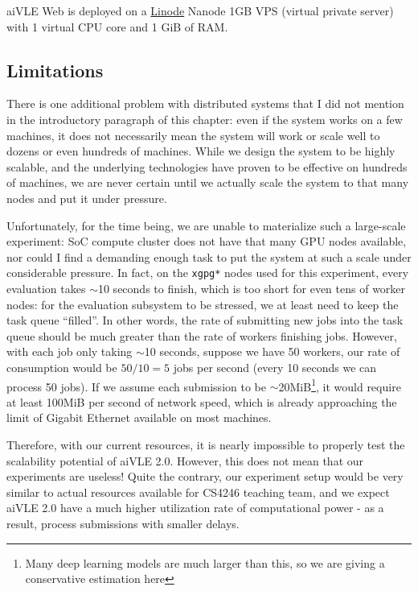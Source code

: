aiVLE Web is deployed on a \href{https://linode.com/}{Linode} Nanode 1GB VPS (virtual private server) with 1 virtual CPU core and 1 GiB of RAM.

\subsection{Limitations}
\label{ss:deployment-limitations}
There is one additional problem with distributed systems that I did not mention in the introductory paragraph of this chapter: even if the system works on a few machines, it does not necessarily mean the system will work or scale well to dozens or even hundreds of machines. While we design the system to be highly scalable, and the underlying technologies have proven to be effective on hundreds of machines, we are never certain until we actually scale the system to that many nodes and put it under pressure.

Unfortunately, for the time being, we are unable to materialize such a large-scale experiment: SoC compute cluster does not have that many GPU nodes available, nor could I find a demanding enough task to put the system at such a scale under considerable pressure. In fact, on the \texttt{xgpg*} nodes used for this experiment, every evaluation takes $\sim$10 seconds to finish, which is too short for even tens of worker nodes: for the evaluation subsystem to be stressed, we at least need to keep the task queue ``filled''. In other words, the rate of submitting new jobs into the task queue should be much greater than the rate of workers finishing jobs. However, with each job only taking $\sim$10 seconds, suppose we have 50 workers, our rate of consumption would be $50/10=5$ jobs per second (every 10 seconds we can process 50 jobs). If we assume each submission to be $\sim$20MiB\footnote{Many deep learning models are much larger than this, so we are giving a conservative estimation here}, it would require at least 100MiB per second of network speed, which is already approaching the limit of Gigabit Ethernet available on most machines.

Therefore, with our current resources, it is nearly impossible to properly test the scalability potential of aiVLE 2.0. However, this does not mean that our experiments are useless! Quite the contrary, our experiment setup would be very similar to actual resources available for CS4246 teaching team, and we expect aiVLE 2.0 have a much higher utilization rate of computational power - as a result, process submissions with smaller delays.


